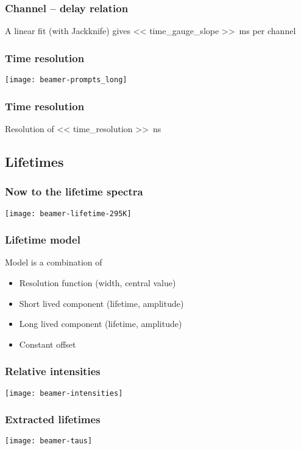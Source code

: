 \documentclass[english, fleqn]{beamer}
\begin{document}
\begin{frame}
    \frametitle{Channel -- delay relation}

    A linear fit (with Jackknife) gives
    \SI{<< time_gauge_slope >>}{\milli\second} per channel
\end{frame}


\begin{frame}
    \frametitle{Time resolution}

    \centering
    \texttt{[image: beamer-prompts\_long]}
\end{frame}

\begin{frame}
    \frametitle{Time resolution}

    Resolution of \SI{<< time_resolution >>}{\nano\second}
\end{frame}

\subsection{Lifetimes}

\begin{frame}
    \frametitle{Now to the lifetime spectra}
    
    \centering
    \texttt{[image: beamer-lifetime-295K]}
\end{frame}

\begin{frame}
    \frametitle{Lifetime model}

    Model is a combination of
    \begin{itemize}
        \item Resolution function (width, central value)
        \item Short lived component (lifetime, amplitude)
        \item Long lived component (lifetime, amplitude)
        \item Constant offset
    \end{itemize}
\end{frame}

\begin{frame}
    \frametitle{Relative intensities}

    \centering
    \texttt{[image: beamer-intensities]}
\end{frame}

\begin{frame}
    \frametitle{Extracted lifetimes}

    \centering
    \texttt{[image: beamer-taus]}
\end{frame}
\end{document}

